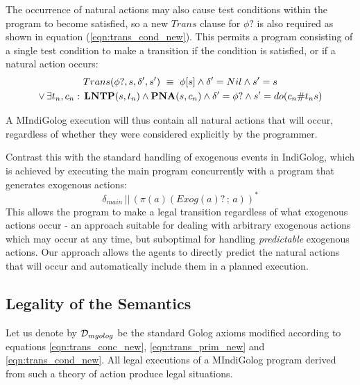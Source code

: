 The occurrence of natural actions may also cause test conditions within
the program to become satisfied, so a new $Trans$ clause for $\phi?$
is also required as shown in equation (\ref{eqn:trans_cond_new}).
This permits a program consisting of a single test condition to make
a transition if the condition is satisfied, or if a natural action
occurs: \begin{multline}
Trans(\phi?,s,\delta',s')\,\,\equiv\,\,\phi[s]\wedge\delta'=Nil\wedge s'=s\\
\vee\,\exists t_{n},c_{n}:\,\mathbf{LNTP}(s,t_{n})\wedge\mathbf{PNA}(s,c_{n})\wedge\delta'=\phi?\wedge s'=do(c_{n}\#t_{n}s)\label{eqn:trans_cond_new}\end{multline}


A MIndiGolog execution will thus contain all natural actions that
will occur, regardless of whether they were considered explicitly
by the programmer.

Contrast this with the standard handling of exogenous events in IndiGolog,
which is achieved by executing the main program concurrently with
a program that generates exogenous actions:\[
\delta_{main}\,||\,\left(\pi(a)(Exog(a)?\,;\, a)\right)^{*}\]
 This allows the program to make a legal transition regardless of
what exogenous actions occur - an approach suitable for dealing with
arbitrary exogenous actions which may occur at any time, but suboptimal
for handling \emph{predictable} exogenous actions. Our approach allows
the agents to directly predict the natural actions that will occur
and automatically include them in a planned execution.


\subsection{Legality of the Semantics}

Let us denote by $\mathcal{D}_{mgolog}$ be the standard Golog axioms modified
according to equations \eqref{eqn:trans_conc_new}, \eqref{eqn:trans_prim_new}
and \eqref{eqn:trans_cond_new}. All legal executions of a MIndiGolog
program derived from such a theory of action produce legal situations.

